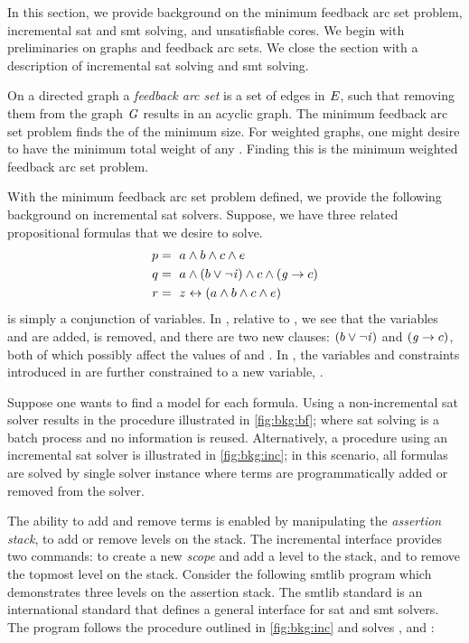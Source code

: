 \label{section:background}
%

%

In this section, we provide background on the minimum feedback arc set problem,
incremental \ac{sat} and \ac{smt} solving, and unsatisfiable cores. We begin
with preliminaries on graphs and feedback arc sets. We close the section with a
description of incremental \ac{sat} solving and \ac{smt} solving.

On a directed graph  a \emph{feedback arc set}  is a set
of edges in $\mathit{E}$, such that removing them from the graph $\mathit{G}$ results in
an acyclic graph. The minimum feedback arc set problem finds the
 of the minimum size. For weighted graphs, one might desire
 to have the minimum total weight of any . Finding this
 is the minimum weighted feedback arc set problem.

%
%
With the minimum feedback arc set problem defined, we provide the following
background on incremental \ac{sat} solvers. Suppose, we have three related
propositional formulas that we desire to solve.
%
\begin{align*}
  p &=\ a \wedge b \wedge c \wedge e  \\
  q &=\ a \wedge (b \vee \neg \mathit{i}{}) \wedge c \wedge (\mathit{g}{} \rightarrow c) \\
  r &=~z \leftrightarrow (a \wedge b \wedge c \wedge e)
\end{align*}
%
\pV{} is simply a conjunction of variables. In \qV{}, relative to \pV{}, we see
that the variables \iV{} and \gV{} are added, \eV{} is removed, and there are
two new clauses: $(b \vee \neg \mathit{i}{})$ and $(\mathit{g}{} \rightarrow c)$, both of
which possibly affect the values of \bV{} and \cV{}. In \rV{}, the variables and
constraints introduced in \pV{} are further constrained to a new variable,
\zV{}.

Suppose one wants to find a model for each formula. Using a non-incremental
\ac{sat} solver results in the procedure illustrated in \autoref{fig:bkg:bf};
where \ac{sat} solving is a batch process and no information is reused.
Alternatively, a procedure using an incremental \ac{sat} solver is illustrated
in \autoref{fig:bkg:inc}; in this scenario, all formulas are solved by single
solver instance where terms are programmatically added or removed from the
solver.

The ability to add and remove terms is enabled by manipulating the
\textit{assertion stack}, to add or remove levels on the stack. The incremental
interface provides two commands:  to create a new \emph{scope} and add
a level to the stack, and  to remove the topmost level on the stack.
Consider the following \acl{smtlib} program which demonstrates three levels on
the assertion stack. The \acl{smtlib} standard is an international standard that
defines a general interface for \ac{sat} and \ac{smt} solvers. The program
follows the procedure outlined in \autoref{fig:bkg:inc} and solves \pV, \qV{}
and \rV{}:

